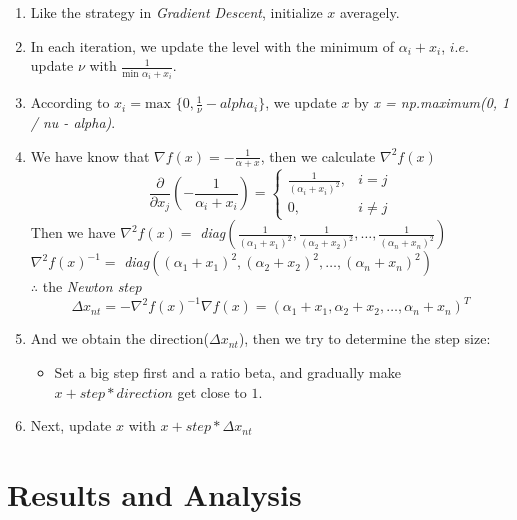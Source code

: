 \documentclass[12pt, a4paper, oneside]{article}
\begin{document}
\begin{enumerate}
    \item Like the strategy in \textit{Gradient Descent}, initialize $x$ averagely.
    \item In each iteration, we update the level with the minimum of $\alpha_i + x_i$, $i.e.$ update $\nu$ with $\frac{1}{\mbox{min }\alpha_i + x_i}$.
    \item According to $x_i = \mbox{max }\{0, \frac{1}{\nu} - alpha_i\}$, we update $x$ by \textit{x = np.maximum(0, 1 / nu - alpha)}.
    \item 
    {
        We have know that $\nabla f(x) = -\frac{1}{\alpha + x}$, then we calculate $\nabla^2 f(x)$
        \begin{displaymath}
            \frac{\partial }{\partial x_j}(-\frac{1}{\alpha_i + x_i}) = \left\{ 
                \begin{array}{lcr}
                    \frac{1}{(\alpha_i + x_i)^2}  , &  i = j \\
                    0 , & i \neq j
                \end{array}
            \right.
        \end{displaymath}
        Then we have $\nabla^2 f(x) = $ \textit{diag}$(\frac{1}{(\alpha_1 + x_1)^2}, \frac{1}{(\alpha_2 + x_2)^2}, \dots, \frac{1}{(\alpha_n + x_n)^2})$\\
        $\nabla^2 f(x)^{-1} = $ \textit{diag}$((\alpha_1 + x_1)^2, (\alpha_2 + x_2)^2, \dots, (\alpha_n + x_n)^2)$\\
        $\therefore$ the \textit{Newton step} 
        \begin{displaymath}
            \Delta x_{nt} = -\nabla^2f(x)^{-1}\nabla f(x) = (\alpha_1 + x_1, \alpha_2 + x_2, \dots, \alpha_n + x_n)^{T}
        \end{displaymath}
    }
    \item 
    {
        And we obtain the direction($\Delta x_{nt}$), then we try to determine the step size:
        \begin{itemize}
            \item Set a big step first and a ratio beta, and gradually make $x + step * direction$ get close to $1$.
        \end{itemize}
    }
    \item 
    {
        Next, update $x$ with $x + step * \Delta x_{nt}$
    }
\end{enumerate}


\section{Results and Analysis}
\end{document}
